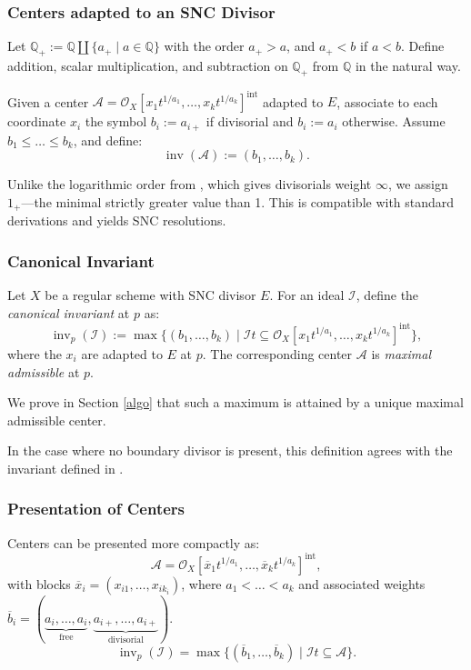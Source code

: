 \documentclass{amsart}
\newcommand{\QQ}{{\mathbb{Q}}}
\newcommand{\cA}{{\mathcal A}}
\newcommand{\cI}{{\mathcal I}}
\newcommand{\cO}{{\mathcal O}}
\newcommand{\inv}{{\operatorname{inv}}}
\newcommand{\inte}{{\operatorname{int}}}
\begin{document}
\subsubsection{Centers adapted to an SNC Divisor}
Let \( \QQ_+ := \QQ \amalg \{a_+ \mid a \in \QQ\} \) with the order $a_+ > a$, and $a_+ < b$ if $a < b$. Define addition, scalar multiplication, and subtraction on \( \QQ_+ \) from \( \QQ \) in the natural way.

Given a center \( \cA = \cO_X[x_1t^{1/a_1}, \ldots, x_kt^{1/a_k}]^\inte \)  adapted  to $E$, associate to each coordinate $x_i$ the symbol $b_i := a_{i+}$ if divisorial and $b_i := a_i$ otherwise. Assume $b_1 \leq \ldots \leq b_k$, and define:
\[ \inv(\cA) := (b_1, \ldots, b_k). \]

\begin{remark}
Unlike the logarithmic order from \cite[Section 3.6]{ATW-principalization}, which gives divisorials weight $\infty$, we assign $1_+$---the minimal strictly greater value than 1. This is compatible with standard derivations and yields SNC resolutions.
\end{remark}

\subsubsection{Canonical Invariant}
\begin{definition}\label{inva3}
Let $X$ be a regular scheme with SNC divisor $E$. For an ideal $\cI$, define the \emph{canonical invariant} at $p$ as:
\[ \inv_p(\cI) := \max \{ (b_1, \ldots, b_k) \mid \cI t \subseteq \cO_X[x_1t^{1/a_1}, \ldots, x_kt^{1/a_k}]^\inte \}, \]
where the $x_i$ are  adapted  to $E$ at $p$. The corresponding center $\cA$ is \emph{maximal admissible} at $p$.
\end{definition}

\begin{remark}
We prove in Section \ref{algo} that such a maximum is attained by a unique maximal admissible center.

In the case where no boundary divisor is present, this definition agrees with the invariant defined in \cite{ATW-weighted}.

\end{remark}

\subsubsection{Presentation of Centers}
Centers can be presented more compactly as:
\[ \cA = \cO_X[\overline{x}_1t^{1/a_1}, \ldots, \overline{x}_kt^{1/a_k}]^\inte, \]
with blocks \( \overline{x}_i = (x_{i1}, \ldots, x_{ik_i}) \), where $a_1<\ldots<a_k$  and associated weights \( \overline{b}_i =(\underbrace{a_i,\ldots,a_i}_{\text{free}}, \underbrace{a_{i+},\ldots,a_{i+}}_{\text{divisorial}})
 \).
\[ \inv_p(\cI) = \max \{ (\overline{b}_1, \ldots, \overline{b}_k) \mid \cI t \subseteq \cA \}. \]
\end{document}

